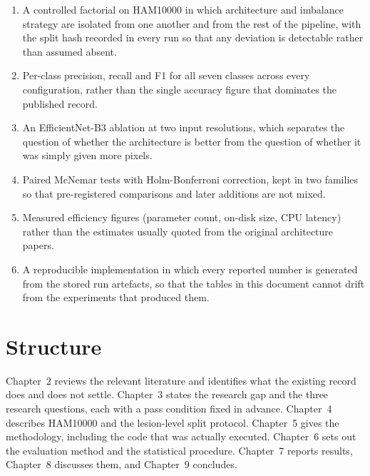 \begin{enumerate}
  \item A controlled factorial on HAM10000 in which architecture and imbalance strategy
        are isolated from one another and from the rest of the pipeline, with the split
        hash recorded in every run so that any deviation is detectable rather than
        assumed absent.
  \item Per-class precision, recall and F1 for all seven classes across every
        configuration, rather than the single accuracy figure that dominates the
        published record.
  \item An EfficientNet-B3 ablation at two input resolutions, which separates the
        question of whether the architecture is better from the question of whether it
        was simply given more pixels.
  \item Paired McNemar tests with Holm-Bonferroni correction, kept in two families so
        that pre-registered comparisons and later additions are not mixed.
  \item Measured efficiency figures (parameter count, on-disk size, CPU latency) rather
        than the estimates usually quoted from the original architecture papers.
  \item A reproducible implementation in which every reported number is generated from
        the stored run artefacts, so that the tables in this document cannot drift from
        the experiments that produced them.
\end{enumerate}

\section{Structure}

Chapter~2 reviews the relevant literature and identifies what the existing record does
and does not settle. Chapter~3 states the research gap and the three research questions,
each with a pass condition fixed in advance. Chapter~4 describes HAM10000 and the
lesion-level split protocol. Chapter~5 gives the methodology, including the code that
was actually executed. Chapter~6 sets out the evaluation method and the statistical
procedure. Chapter~7 reports results, Chapter~8 discusses them, and Chapter~9 concludes.
